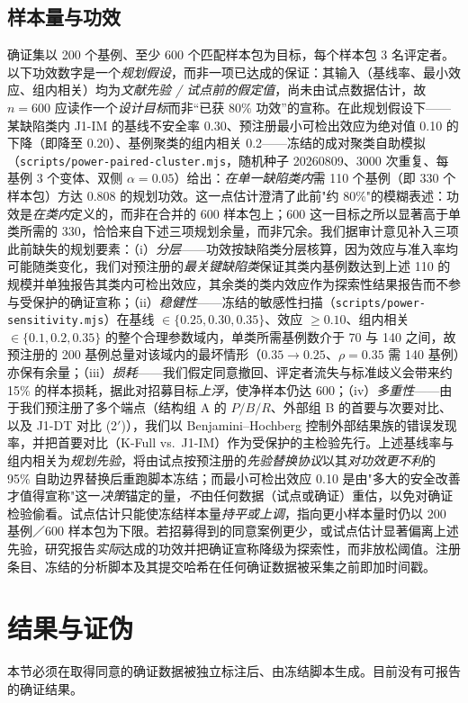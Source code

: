 \documentclass[11pt]{ctexart}
\begin{document}
\subsection{样本量与功效}
确证集以 200 个基例、至少 600 个匹配样本包为目标，每个样本包 3 名评定者。以下功效数字是一个\emph{规划假设}，而非一项已达成的保证：其输入（基线率、最小效应、组内相关）均为\emph{文献先验 / 试点前的假定值}，尚未由试点数据估计，故 $n=600$ 应读作一个\emph{设计目标}而非“已获 80\% 功效”的宣称。在此规划假设下——某缺陷类内 J1-IM 的基线不安全率 0.30、预注册最小可检出效应为绝对值 0.10 的下降（即降至 0.20）、基例聚类的组内相关 0.2——冻结的成对聚类自助模拟（\texttt{scripts/power-paired-cluster.mjs}，随机种子 20260809、3000 次重复、每基例 3 个变体、双侧 $\alpha=0.05$）给出：\emph{在单一缺陷类内}需 110 个基例（即 330 个样本包）方达 $0.808$ 的规划功效。这一点估计澄清了此前"约 80\%"的模糊表述：功效是\emph{在类内}定义的，而非在合并的 600 样本包上；600 这一目标之所以显著高于单类所需的 330，恰恰来自下述三项规划余量，而非冗余。我们据审计意见补入三项此前缺失的规划要素：（i）\emph{分层}——功效按缺陷类分层核算，因为效应与准入率均可能随类变化，我们对预注册的\emph{最关键缺陷类}保证其类内基例数达到上述 110 的规模并单独报告其类内可检出效应，其余类的类内效应作为探索性结果报告而不参与受保护的确证宣称；（ii）\emph{稳健性}——冻结的敏感性扫描（\texttt{scripts/power-sensitivity.mjs}）在基线 $\in\{0.25,0.30,0.35\}$、效应 $\geq 0.10$、组内相关 $\in\{0.1,0.2,0.35\}$ 的整个合理参数域内，单类所需基例数介于 70 与 140 之间，故预注册的 200 基例总量对该域内的最坏情形（$0.35\!\to\!0.25$、$\rho=0.35$ 需 140 基例）亦保有余量；（iii）\emph{损耗}——我们假定同意撤回、评定者流失与标准歧义会带来约 15\% 的样本损耗，据此对招募目标\emph{上浮}，使净样本仍达 600；（iv）\emph{多重性}——由于我们预注册了多个端点（结构组 A 的 $P/B/R$、外部组 B 的首要与次要对比、以及 J1-DT 对比 (2$'$)），我们以 Benjamini–Hochberg 控制外部结果族的错误发现率，并把首要对比（K-Full vs.\ J1-IM）作为受保护的主检验先行。上述基线率与组内相关为\emph{规划先验}，将由试点按预注册的\emph{先验替换协议}以其\emph{对功效更不利}的 95\% 自助边界替换后重跑脚本冻结；而最小可检出效应 0.10 是由"多大的安全改善才值得宣称"这一\emph{决策}锚定的量，\emph{不}由任何数据（试点或确证）重估，以免对确证检验偷看。试点估计只能使冻结样本量\emph{持平或上调}，指向更小样本量时仍以 200 基例／600 样本包为下限。若招募得到的同意案例更少，或试点估计显著偏离上述先验，研究报告\emph{实际}达成的功效并把确证宣称降级为探索性，而非放松阈值。注册条目、冻结的分析脚本及其提交哈希在任何确证数据被采集之前即加时间戳。

\section{结果与证伪}
\label{sec:results}
本节必须在取得同意的确证数据被独立标注后、由冻结脚本生成。目前没有可报告的确证结果。
\end{document}

